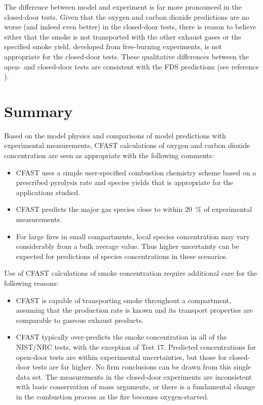 The difference between model and experiment is far more pronounced in the closed-door tests.  Given that the oxygen and carbon dioxide predictions are no worse (and indeed even better) in the closed-door tests, there is reason to believe either that the smoke is not transported with the other exhaust gases or the specified smoke yield, developed from free-burning experiments, is not appropriate for the closed-door tests.  These qualitative differences between the open- and closed-door tests are consistent with the FDS predictions (see reference \cite{NRCNUREG1824_FDS}).

\section{Summary}

Based on the model physics and comparisons of model predictions with experimental measurements, CFAST calculations of oxygen and carbon dioxide concentration are seen as appropriate with the following comments:

\begin{itemize}
\item CFAST uses a simple user-specified combustion chemistry scheme based on a prescribed pyrolysis rate and species yields that is appropriate for the applications studied.
\item CFAST predicts the major gas species close to within 20~\% of experimental measurements.
\item For large fires in small compartments, local species concentration may vary considerably from a bulk average value.  Thus higher uncertainty can be expected for predictions of species concentrations in these scenarios.
\end{itemize}

Use of CFAST calculations of smoke concentration require additional care for the following reasons:

\begin{itemize}
\item CFAST is capable of transporting smoke throughout a compartment, assuming that the production rate is known and its transport properties are comparable to gaseous exhaust products.
\item CFAST typically over-predicts the smoke concentration in all of the NIST/NRC tests, with the exception of Test 17.  Predicted concentrations for open-door tests are within experimental uncertainties, but those for closed-door tests are far higher.  No firm conclusions can be drawn from this single data set.  The measurements in the closed-door experiments are inconsistent with basic conservation of mass arguments, or there is a fundamental change in the combustion process as the fire becomes oxygen-starved.
\end{itemize}